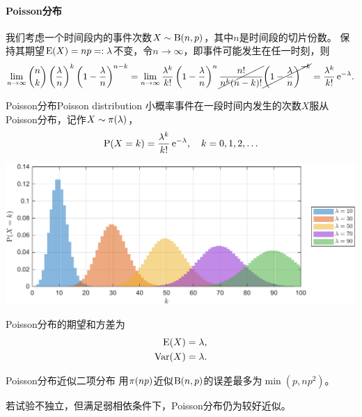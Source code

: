 \paragraph{Poisson分布}

我们考虑一个时间段内的事件次数$X\sim\operatorname{B}(n,p)$，其中$n$是时间段的切片份数。
保持其期望$\operatorname{E}(X)=np=:\lambda$不变，令$n\to\infty$，即事件可能发生在任一时刻，则
\[
	\lim_{n\to\infty}\binom nk\left(\frac\lambda{n}\right)^k\left(1-\frac\lambda{n}\right)^{n-k}=\lim_{n\to\infty}\frac{\lambda^k}{k!}\left(1-\frac\lambda{n}\right)^n\cancel{\frac{n!}{n^k(n-k)!}}\cancel{\left(1-\frac\lambda{n}\right)^{-k}}=\frac{\lambda^k}{k!}\mathop{}\!\mathrm{e}^{-\lambda}.
\]

\begin{definition}{Poisson分布}{Poisson distribution}
	小概率事件在一段时间内发生的次数$X$服从Poisson分布，记作$X\sim\operatorname{\pi}(\lambda)$，
	\[
		\operatorname{P}(X=k)=\frac{\lambda^k}{k!}\mathop{}\!\mathrm{e}^{-\lambda},\quad k=0,1,2,\ldots
	\]
	\begin{center}
		\includegraphics[width=.9\textwidth]{figures/pdf_poission.pdf}
	\end{center}
\end{definition}
\begin{corollary}
	Poisson分布的期望和方差为
	\begin{subequations}
		\begin{align}
			\operatorname{E}(X)&=\lambda,\\
			\operatorname{Var}(X)&=\lambda.
		\end{align}
	\end{subequations}
\end{corollary}

\begin{theorem}{Poisson分布近似二项分布}{}
	用$\operatorname{\pi}(np)$近似$\operatorname{B}(n,p)$的误差最多为$\min(p,np^2)$。
\end{theorem}

\begin{remark}
	若试验不独立，但满足弱相依条件下，Poisson分布仍为较好近似。
\end{remark}

